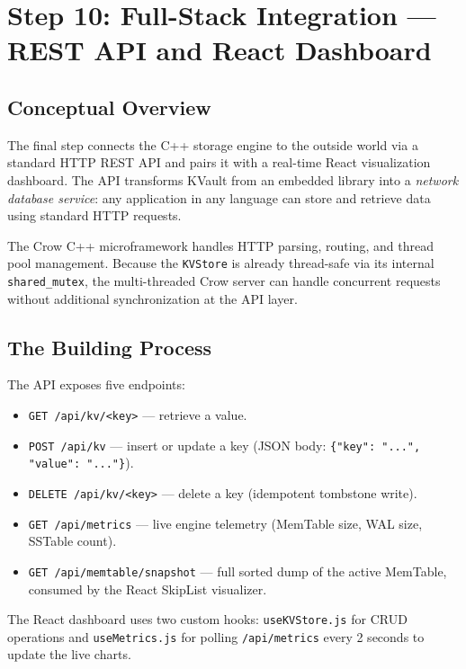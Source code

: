 \documentclass[11pt,a4paper]{article}
\begin{document}
\section{Step 10: Full-Stack Integration --- REST API and React Dashboard}
\label{sec:api_dashboard}

\subsection{Conceptual Overview}

The final step connects the C++ storage engine to the outside world via a
standard HTTP REST API and pairs it with a real-time React visualization
dashboard. The API transforms KVault from an embedded library into a
\emph{network database service}: any application in any language can store
and retrieve data using standard HTTP requests.

The Crow C++ microframework handles HTTP parsing, routing, and thread pool
management. Because the \texttt{KVStore} is already thread-safe via its
internal \texttt{shared\_mutex}, the multi-threaded Crow server can handle
concurrent requests without additional synchronization at the API layer.

\subsection{The Building Process}

The API exposes five endpoints:
\begin{itemize}[noitemsep]
    \item \texttt{GET /api/kv/<key>} --- retrieve a value.
    \item \texttt{POST /api/kv} --- insert or update a key (JSON body: \texttt{\{"key": "...", "value": "..."\}}).
    \item \texttt{DELETE /api/kv/<key>} --- delete a key (idempotent tombstone write).
    \item \texttt{GET /api/metrics} --- live engine telemetry (MemTable size, WAL size, SSTable count).
    \item \texttt{GET /api/memtable/snapshot} --- full sorted dump of the active MemTable, consumed by the React SkipList visualizer.
\end{itemize}

The React dashboard uses two custom hooks: \texttt{useKVStore.js} for
CRUD operations and \texttt{useMetrics.js} for polling
\texttt{/api/metrics} every 2 seconds to update the live charts.
\end{document}
